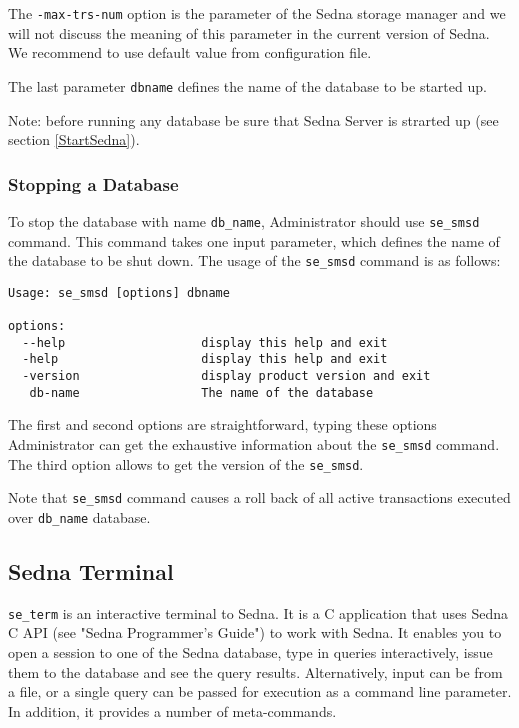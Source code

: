 \documentclass[a4paper,12pt]{article}
\begin{document}
The \verb!-max-trs-num! option is the parameter of the Sedna storage manager and we will not discuss the meaning of this parameter in the current version of Sedna. We recommend to use default value from configuration file.


The last parameter \verb!dbname!  defines the name of the database to be started up. 


Note: before running any database be sure that Sedna Server is strarted up (see section \ref{StartSedna}).

\subsubsection{Stopping a Database}

To stop the database with name \verb!db_name!, Administrator should use \verb!se_smsd! command. This command takes one input parameter, which defines the name of the database to be shut down. The usage of the \verb!se_smsd! command is as follows:

\begin{verbatim}
Usage: se_smsd [options] dbname

options:
  --help                   display this help and exit
  -help                    display this help and exit
  -version                 display product version and exit
   db-name                 The name of the database
\end{verbatim}

The first and second options are straightforward, typing these options Administrator can get the exhaustive information about the \verb!se_smsd! command.
The third option allows to get the version of the \verb!se_smsd!.

Note that \verb!se_smsd! command causes a roll back of all active transactions executed over \verb!db_name! database.


\subsection{Sedna Terminal}
\verb!se_term! is an interactive terminal to Sedna. It is a C application that uses Sedna C API (see "Sedna Programmer's Guide") to work with Sedna. It enables you to open a session to one of the Sedna database, type in queries interactively, issue them to the database and see the query results. Alternatively, input can be from a file, or a single query can be passed for execution as a command line parameter. In addition, it provides a number of meta-commands. 
\end{document}
